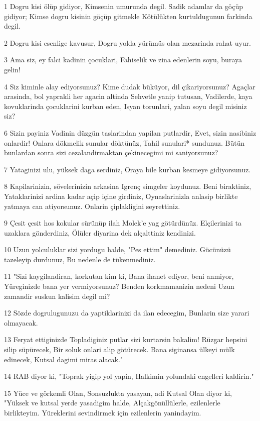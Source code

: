 \par 1 Dogru kisi ölüp gidiyor, Kimsenin umurunda degil. Sadik adamlar da göçüp gidiyor; Kimse dogru kisinin göçüp gitmekle Kötülükten kurtuldugunun farkinda degil.
\par 2 Dogru kisi esenlige kavusur, Dogru yolda yürümüs olan mezarinda rahat uyur.
\par 3 Ama siz, ey falci kadinin çocuklari, Fahiselik ve zina edenlerin soyu, buraya gelin!
\par 4 Siz kiminle alay ediyorsunuz? Kime dudak büküyor, dil çikariyorsunuz? Agaçlar arasinda, bol yaprakli her agacin altinda Sehvetle yanip tutusan, Vadilerde, kaya kovuklarinda çocuklarini kurban eden, Isyan torunlari, yalan soyu degil misiniz siz?
\par 6 Sizin payiniz Vadinin düzgün taslarindan yapilan putlardir, Evet, sizin nasibiniz onlardir! Onlara dökmelik sunular döktünüz, Tahil sunulari* sundunuz. Bütün bunlardan sonra sizi cezalandirmaktan çekinecegimi mi saniyorsunuz?
\par 7 Yataginizi ulu, yüksek daga serdiniz, Oraya bile kurban kesmeye gidiyorsunuz.
\par 8 Kapilarinizin, sövelerinizin arkasina Igrenç simgeler koydunuz. Beni biraktiniz, Yataklarinizi ardina kadar açip içine girdiniz, Oynaslarinizla anlasip birlikte yatmaya can atiyorsunuz. Onlarin çiplakligini seyrettiniz.
\par 9 Çesit çesit hos kokular sürünüp ilah Molek'e yag götürdünüz. Elçilerinizi ta uzaklara gönderdiniz, Ölüler diyarina dek alçalttiniz kendinizi.
\par 10 Uzun yolculuklar sizi yordugu halde, "Pes ettim" demediniz. Gücünüzü tazeleyip durdunuz, Bu nedenle de tükenmediniz.
\par 11 "Sizi kaygilandiran, korkutan kim ki, Bana ihanet ediyor, beni anmiyor, Yüreginizde bana yer vermiyorsunuz? Benden korkmamanizin nedeni Uzun zamandir suskun kalisim degil mi?
\par 12 Sözde dogrulugunuzu da yaptiklarinizi da ilan edecegim, Bunlarin size yarari olmayacak.
\par 13 Feryat ettiginizde Topladiginiz putlar sizi kurtarsin bakalim! Rüzgar hepsini silip süpürecek, Bir soluk onlari alip götürecek. Bana siginansa ülkeyi mülk edinecek, Kutsal dagimi miras alacak."
\par 14 RAB diyor ki, "Toprak yigip yol yapin, Halkimin yolundaki engelleri kaldirin."
\par 15 Yüce ve görkemli Olan, Sonsuzlukta yasayan, adi Kutsal Olan diyor ki, "Yüksek ve kutsal yerde yasadigim halde, Alçakgönüllülerle, ezilenlerle birlikteyim. Yüreklerini sevindirmek için ezilenlerin yanindayim.
